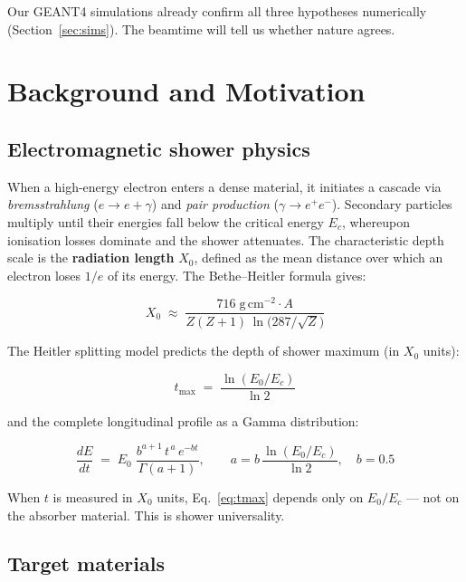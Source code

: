 \documentclass[11pt,a4paper]{article}
\begin{document}
Our GEANT4 simulations already confirm all three hypotheses numerically
(Section~\ref{sec:sims}). The beamtime will tell us whether nature agrees.

\section{Background and Motivation}
\label{sec:background}

\subsection{Electromagnetic shower physics}

When a high-energy electron enters a dense material, it initiates a cascade
via \emph{bremsstrahlung} ($e \to e + \gamma$) and \emph{pair production}
($\gamma \to e^+e^-$).  Secondary particles multiply until their energies
fall below the critical energy $E_c$, whereupon ionisation losses dominate
and the shower attenuates.  The characteristic depth scale is the
\textbf{radiation length} $X_0$, defined as the mean distance over which an
electron loses $1/e$ of its energy.  The Bethe--Heitler formula gives:

\begin{equation}
  X_0 \;\approx\;
  \frac{716\;\mathrm{g\,cm^{-2}} \cdot A}
       {Z(Z+1)\,\ln\!\bigl(287/\sqrt{Z}\bigr)}
  \label{eq:X0}
\end{equation}

The Heitler splitting model predicts the depth of shower maximum
(in $X_0$ units):

\begin{equation}
  t_{\max} \;=\; \frac{\ln(E_0/E_c)}{\ln 2}
  \label{eq:tmax}
\end{equation}

and the complete longitudinal profile as a Gamma distribution:

\begin{equation}
  \frac{dE}{dt} \;=\; E_0\;
  \frac{b^{a+1}\,t^{\,a}\,e^{-bt}}{\Gamma(a+1)},
  \qquad
  a = b\,\frac{\ln(E_0/E_c)}{\ln 2},
  \quad b = 0.5
  \label{eq:gamma}
\end{equation}

When $t$ is measured in $X_0$ units, Eq.~\eqref{eq:tmax} depends only on
$E_0/E_c$ --- not on the absorber material.  This is shower universality.

\subsection{Target materials}
\end{document}
